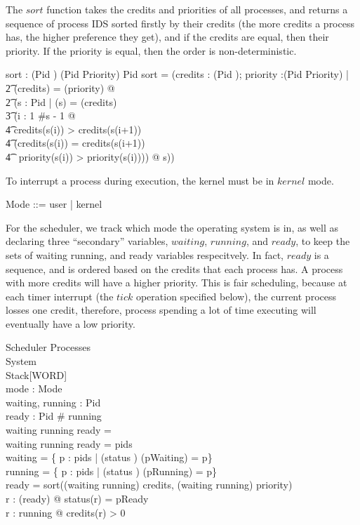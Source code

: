 The $sort$ function takes the credits and priorities of all processes,
and returns a sequence of process IDS sorted firstly by their credits
(the more credits a process has, the higher preference they get), and
if the credits are equal, then their priority. If the priority is
equal, then the order is non-deterministic.

\begin{axdef}
    sort : (Pid \pfun \nat) \cross (Pid \pfun Priority) \pfun \iseq Pid
\where
    sort = (\lambda credits : (Pid \pfun \nat); priority :(Pid \pfun Priority) |\\
	\t2 \dom(credits) = \dom(priority) @\\
	\t2 (\mu s : \iseq Pid | \ran(s) = \dom(credits) \land\\
	    \t3 (\forall i : 1 \upto \#s - 1 @\\
	 	\t4 credits(s(i)) > credits(s(i+1)) \lor\\
	 	\t4 (credits(s(i)) = credits(s(i+1)) \land\\
		\t4 \ priority(s(i)) > priority(s(i)))) @ s))
\end{axdef}

To interrupt a process during execution, the kernel must be in $kernel$ mode.

\begin{zed}
    Mode ::= user | kernel
\end{zed}

For the scheduler, we track which mode the operating system is in, as
well as declaring three ``secondary'' variables, $waiting$, $running$,
and $ready$, to keep the sets of waiting running, and ready variables
respecitvely. In fact, $ready$ is a sequence, and is ordered based on
the credits that each process has. A process with more credits will
have a higher priority. This is fair scheduling, because at each timer
interrupt (the $tick$ operation specified below), the current process
losses one credit, therefore, process spending a lot of time executing
will eventually have a low priority.

\begin{schema}{Scheduler}
    Processes\\
    System\\
    Stack[WORD]\\
    mode : Mode\\
    waiting, running : \power Pid\\
    ready : \iseq Pid
\where
    \# running \\
    waiting \cap running \cap \ran ready = \emptyset\\
    waiting \cup running \cup \ran ready = pids\\
    waiting = \{ p : pids | (status \inv) (pWaiting) = p\}\\
    running = \{ p : pids | (status \inv) (pRunning) = p\}\\
    ready = sort((waiting \cup running) \ndres credits, (waiting \cup running) \ndres priority)\\
    \forall r : \ran(ready) @ status(r) = pReady\\
    \forall r : running @ credits(r) > 0
\end{schema}


